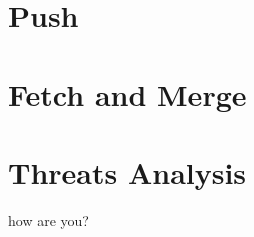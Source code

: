 \documentclass[11pt,oneside]{article}
\begin{document}
\section{Push}

\section{Fetch and Merge}

\section{Threats Analysis}

how are you?
\end{document}
